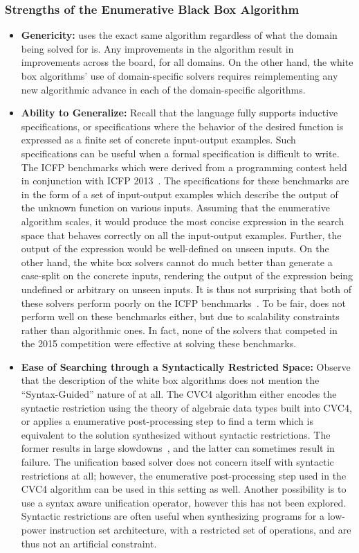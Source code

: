 \subsubsection{Strengths of the Enumerative Black Box Algorithm}
\begin{itemize}
\item
\textbf{Genericity:} \esolver uses the exact same algorithm regardless
of what the domain being solved for is. Any improvements in the
algorithm result in improvements across the board, for all domains. On
the other hand, the white box algorithms' use of domain-specific
solvers requires reimplementing any new algorithmic advance in each of
the domain-specific algorithms.
\item
\textbf{Ability to Generalize:} Recall that the \sygusbody language fully
supports inductive specifications, or specifications where the
behavior of the desired function is expressed as a finite set of
concrete input-output examples. Such specifications can be useful when
a formal specification is difficult to write. The ICFP benchmarks
which were derived from a programming contest held in conjunction with
ICFP 2013~\cite{swamy-13}. The specifications for these benchmarks are
in the form of a set of input-output examples which describe the
output of the unknown function on various inputs. Assuming that the
enumerative algorithm scales, it would produce
the most concise expression in the search space that behaves correctly on
all the input-output examples. Further, the output of the expression
would be well-defined on unseen inputs. On the other hand, the white
box solvers cannot do much better than generate a case-split on the
concrete inputs, rendering the output of the expression being
undefined or arbitrary on unseen inputs. It is thus not surprising
that both of these solvers perform poorly on the ICFP
benchmarks~\cite{radhakrishna-15,reynolds-15}. To be fair, \esolver
does not perform well on these benchmarks either, but due to
scalability constraints rather than algorithmic ones.
In fact, none of the
solvers that competed in the 2015 \sygusbody competition were effective at
solving these benchmarks.
\item
\textbf{Ease of Searching through a Syntactically Restricted Space:}
Observe that the description of the white box algorithms does not
mention the ``Syntax-Guided'' nature of \sygusbody at all. The CVC4
algorithm either encodes the syntactic restriction using the theory of
algebraic data types built into CVC4, or applies a enumerative
post-processing step to find a term which is equivalent to the
solution synthesized without syntactic restrictions. The former
results in large slowdowns~\cite{reynolds-15}, and the latter can
sometimes result in failure. The unification based solver does not
concern itself with syntactic restrictions at all; however, the
enumerative post-processing step used in the CVC4 algorithm can be
used in this setting as well. Another possibility is to use a syntax
aware unification operator, however this has not been explored.
Syntactic restrictions are often useful
when synthesizing programs for a low-power instruction set
architecture, with a restricted set of operations, and are thus not an
artificial constraint.
\end{itemize}

